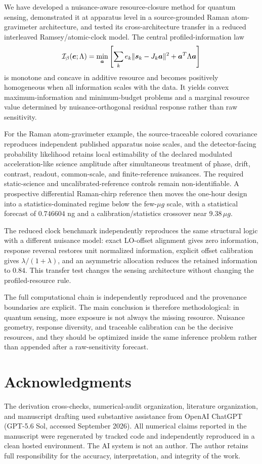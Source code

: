 We have developed a nuisance-aware resource-closure method for quantum sensing, demonstrated it at apparatus level in a source-grounded Raman atom-gravimeter architecture, and tested its cross-architecture transfer in a reduced interleaved Ramsey/atomic-clock model. The central profiled-information law
\begin{equation}
\mathcal I_{\beta}(\bm e;\Lambda)=\min_{\bm a}\left[\sum_k e_k\|\bm s_k-J_k\bm a\|^2+\bm a^T\Lambda\bm a\right]
\end{equation}
is monotone and concave in additive resource and becomes positively homogeneous when all information scales with the data. It yields convex maximum-information and minimum-budget problems and a marginal resource value determined by nuisance-orthogonal residual response rather than raw sensitivity.

For the Raman atom-gravimeter example, the source-traceable colored covariance reproduces independent published apparatus noise scales, and the detector-facing probability likelihood retains local estimability of the declared modulated acceleration-like science amplitude after simultaneous treatment of phase, drift, contrast, readout, common-scale, and finite-reference nuisances. The required static-science and uncalibrated-reference controls remain non-identifiable. A prospective differential Raman-chirp reference then moves the one-hour design into a statistics-dominated regime below the few-$\mu g$ scale, with a statistical forecast of $0.746604$ ng and a calibration/statistics crossover near $9.38\,\mu g$.

The reduced clock benchmark independently reproduces the same structural logic with a different nuisance model: exact LO-offset alignment gives zero information, response reversal restores unit normalized information, explicit offset calibration gives $\lambda/(1+\lambda)$, and an asymmetric allocation reduces the retained information to $0.84$. This transfer test changes the sensing architecture without changing the profiled-resource rule.

The full computational chain is independently reproduced and the provenance boundaries are explicit. The main conclusion is therefore methodological: in quantum sensing, more exposure is not always the missing resource. Nuisance geometry, response diversity, and traceable calibration can be the decisive resources, and they should be optimized inside the same inference problem rather than appended after a raw-sensitivity forecast.

\section*{Acknowledgments}
The derivation cross-checks, numerical-audit organization, literature organization, and manuscript drafting used substantive assistance from OpenAI ChatGPT (GPT-5.6 Sol, accessed September 2026). All numerical claims reported in the manuscript were regenerated by tracked code and independently reproduced in a clean hosted environment. The AI system is not an author. The author retains full responsibility for the accuracy, interpretation, and integrity of the work.

